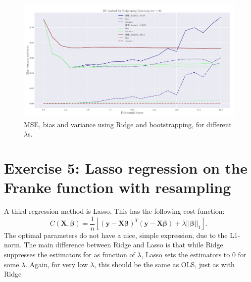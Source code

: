 \documentclass[reprint,english,notitlepage,aps,nobalancelastpage,nofootinbib]{revtex4-1}  %
\begin{document}
\begin{figure}[H]
	\includegraphics[width=\linewidth]{LBVT_Ridge_Bootstrap_n30_eps0_2_p20_lmbm8_2.pdf}
	\caption{MSE, bias and variance using Ridge and bootstrapping, for different $\lambda$s.}
	\label{fig:Ridge_boot_BVT}
\end{figure}




\section*{Exercise 5: Lasso regression on the Franke function with resampling}

A third regression method is Lasso. This has the following cost-function:
\begin{equation*}
	C(\mathbf{X}, \boldsymbol{\beta}) = \frac{1}{n}\left[\left(\mathbf{y}-\mathbf{X}\boldsymbol\beta \right)^T \left(\mathbf{y}-\mathbf{X}\boldsymbol\beta \right)+\lambda ||\boldsymbol{\beta}||_1 \right].
\end{equation*}
The optimal parameters do not have a nice, simple expression, due to the L1-norm. The main difference between Ridge and Lasso is that while Ridge suppresses the estimators for as function of $\lambda$, Lasso sets the estimators to 0 for some $\lambda$. Again, for very low $\lambda$, this should be the same as OLS, just as with Ridge
\end{document}
